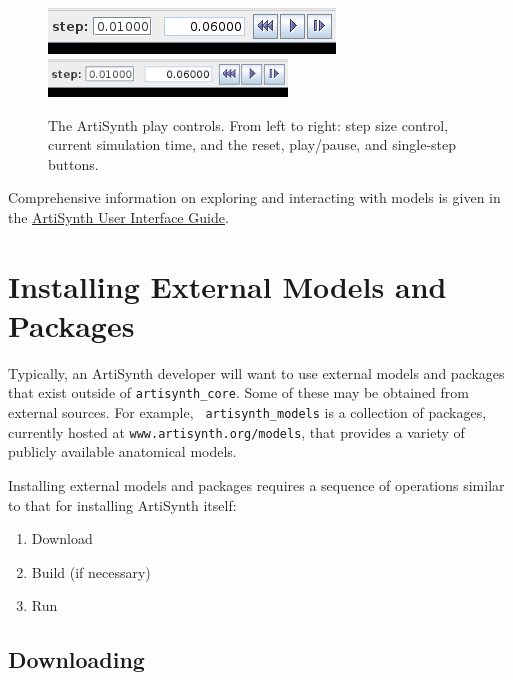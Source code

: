 \documentclass{article}
\begin{document}
\begin{figure}
\begin{center}
\iflatexml
\includegraphics[]{images/playControls}
\else
\includegraphics[width=2.5in]{images/playControls}
\fi
\end{center}
\caption{The ArtiSynth play controls. From left to right: step size
control, current simulation time, and the reset, play/pause, and
single-step buttons.}%
\label{PlayControlsFig}
\end{figure}

Comprehensive information on exploring and interacting with models is
given in the
\href{http://www.artisynth.org/doc/html/uiguide/uiguide.html}
{ArtiSynth User Interface Guide}.

\section{Installing External Models and Packages}
\label{AdditionalModelsAndPackages}

Typically, an ArtiSynth developer will want to use external models and
packages that exist outside of {\tt artisynth\_core}.  Some of these
may be obtained from external sources.  For example, {\tt
artisynth\_models} is a collection of packages, currently hosted at
{\tt www.artisynth.org/models}, that provides a variety of publicly
available anatomical models.

Installing external models and packages requires a sequence of
operations similar to that for installing ArtiSynth itself:

\begin{enumerate}

\item Download

\item Build (if necessary)

\item Run

\end{enumerate}

\subsection{Downloading}
\end{document}
